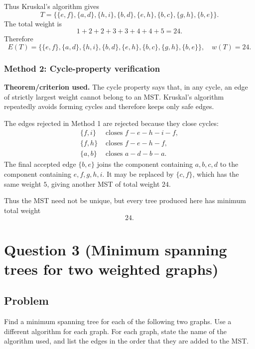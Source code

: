 \documentclass[12pt]{article}
\begin{document}
Thus Kruskal's algorithm gives
\[
  T=\bigl\{
  \{e,f\},\{a,d\},\{h,i\},\{b,d\},\{e,h\},
  \{b,c\},\{g,h\},\{b,e\}
  \bigr\}.
\]
The total weight is
\[
  1+2+2+3+3+4+4+5=24.
\]
Therefore
\[
  \boxed{
  E(T)=\{\{e,f\},\{a,d\},\{h,i\},\{b,d\},\{e,h\},\{b,c\},\{g,h\},\{b,e\}\},
  \quad w(T)=24.}
\]

\subsubsection{Method 2: Cycle-property verification}
\textbf{Theorem/criterion used.} The cycle property says that, in any cycle, an edge of strictly largest weight cannot belong to an MST. Kruskal's algorithm repeatedly avoids forming cycles and therefore keeps only safe edges.

The edges rejected in Method 1 are rejected because they close cycles:
\[
\begin{aligned}
\{f,i\}&\text{ closes }f-e-h-i-f,\\
\{f,h\}&\text{ closes }f-e-h-f,\\
\{a,b\}&\text{ closes }a-d-b-a.
\end{aligned}
\]
The final accepted edge $\{b,e\}$ joins the component containing $a,b,c,d$ to the component containing $e,f,g,h,i$. It may be replaced by $\{c,f\}$, which has the same weight $5$, giving another MST of total weight $24$.

Thus the MST need not be unique, but every tree produced here has minimum total weight
\[
  \boxed{24.}
\]

\newpage
\section{Question 3 (Minimum spanning trees for two weighted graphs)}

\subsection{Problem}
Find a minimum spanning tree for each of the following two graphs. Use a different algorithm for each graph. For each graph, state the name of the algorithm used, and list the edges in the order that they are added to the MST.
\end{document}
